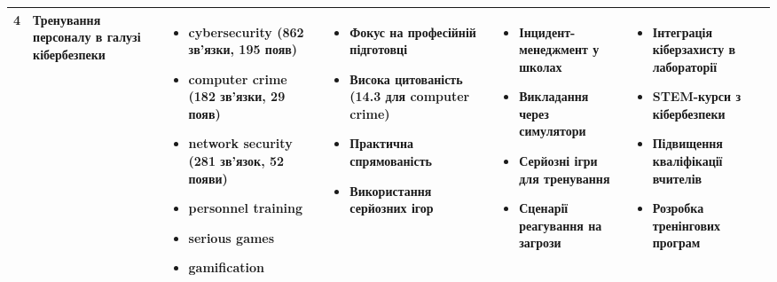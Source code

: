 \documentclass[12pt,a4paper,landscape]{article}
\begin{document}
\begin{longtable}{|p{1cm}|p{3.5cm}|p{5cm}|p{4cm}|p{4cm}|p{5cm}|}
\cellcolor{yellow!20}4 & 
\textbf{Тренування персоналу в галузі кібербезпеки} & 
\begin{itemize}
    \item cybersecurity (862 зв'язки, 195 появ)
    \item computer crime (182 зв'язки, 29 появ)
    \item network security (281 зв'язок, 52 появи)
    \item personnel training
    \item serious games
    \item gamification
\end{itemize} & 
\begin{itemize}
    \item Фокус на професійній підготовці
    \item Висока цитованість (14.3 для computer crime)
    \item Практична спрямованість
    \item Використання серйозних ігор
\end{itemize} & 
\begin{itemize}
    \item Інцидент-менеджмент у школах
    \item Викладання через симулятори
    \item Серйозні ігри для тренування
    \item Сценарії реагування на загрози
\end{itemize} & 
\begin{itemize}
    \item Інтеграція кіберзахисту в лабораторії
    \item STEM-курси з кібербезпеки
    \item Підвищення кваліфікації вчителів
    \item Розробка тренінгових програм
\end{itemize} \\
\hline


\end{longtable}
\end{document}
